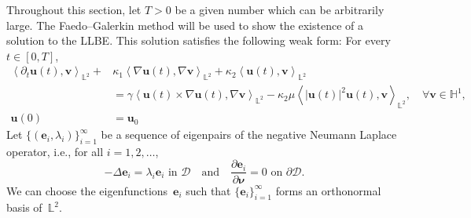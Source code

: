 \documentclass[11pt,reqno]{amsart}
\theoremstyle{definition}
\numberwithin{equation}{section}
\newcommand{\bff}{\boldsymbol}
\newcommand{\bb}{\mathbb}
\newcommand{\pa}{\partial}
\newcommand{\nn}{\nonumber}
\newcommand{\inpro}[2]{\left\langle#1,#2\right\rangle}
\begin{document}
Throughout this section, let $T>0$ be a given number which can be arbitrarily large.
The Faedo--Galerkin method will be used to show the existence of a solution to the LLBE. 
This solution satisfies the following weak form: For every~$t\in[0,T]$,
	\begin{subequations}\label{equ:LLB wea exa}
		\begin{alignat}{1}
			\inpro{\pa_t\bff{u}(t)}{\bff{v}}_{\bb{L}^2}
			+
			&\kappa_1 \inpro{\nabla\bff{u}(t)}{\nabla\bff{v}}_{\bb{L}^2}
			+
			\kappa_2
			\inpro{\bff{u}(t)}{\bff{v}}_{\bb{L}^2}
			\nn\\
			&=
			\gamma
			\inpro{\bff{u}(t)\times\nabla\bff{u}(t)}{\nabla \bff{v}}_{\bb{L}^2}
			-
			\kappa_2 \mu
			\inpro{|\bff{u}(t)|^2\bff{u}(t)}{\bff{v}}_{\bb{L}^2},
			\quad \forall\bff{v}\in\bb{H}^1,
			\label{equ:LLB wea equ exa}
			\\
			\bff{u}(0) &= \bff{u}_{0}
			\label{equ:LLB wea con exa}
		\end{alignat}
	\end{subequations}
Let $\{(\bff{e}_i,\lambda_i)\}_{i=1}^{\infty}$ be a sequence of eigenpairs of the negative Neumann Laplace operator, i.e., for all $i=1,2,\ldots$,
\[
-\Delta\bff{e}_i = \lambda_i\bff{e}_i \text{ in } \mathscr{D}
\quad\text{and}\quad
\frac{\pa\bff{e}_i}{\pa\bff{\nu}} = 0 \text{ on }\pa \mathscr{D}.
\]
We can choose the eigenfunctions~$\bff{e}_i$ such that $\{\bff{e}_i\}_{i=1}^{\infty}$ forms an orthonormal
basis of~$\bb{L}^2$.

\end{document}
